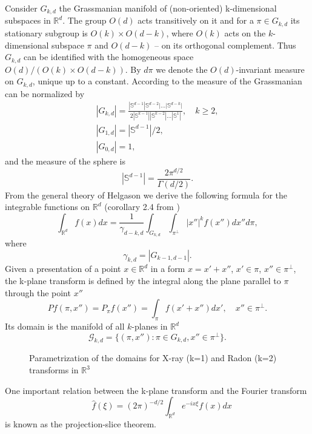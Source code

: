 \documentclass[12pt]{iopart}
\begin{document}
Consider $G_{k,d}$ the Grassmanian manifold of (non-oriented) k-dimensional subspaces in $\mathbb R^d$. The group $O(d)$ acts transitively on it and for a $\pi\in G_{k,d}$ its stationary subgroup is $O(k)\times O(d-k)$, where $O(k)$ acts on the $k$-dimensional subspace $\pi$ and $O(d-k)$ -- on its orthogonal complement. Thus $G_{k,d}$ can be identified with the homogeneous space $O(d)/(O(k)\times O(d-k))$. By $d\pi$ we denote the $O(d)$-invariant measure on $G_{k,d}$, unique up to a constant.  According to \cite{Sa} the measure of the Grassmanian can be normalized by
\begin{eqnarray*}
|G_{k,d}|=\frac{|\mathbb S^{d-1}|\mathbb S^{d-2}|\dots|\mathbb S^{d-k}|}{2|\mathbb S^{k-1}||\mathbb S^{k-2}|\dots|\mathbb S^1|},\quad k\geqslant2,\\
|G_{1,d}|=|\mathbb S^{d-1}|/2,\\
|G_{0,d}|=1,
\end{eqnarray*}
and the measure of the sphere is
    $$
    |\mathbb S^{d-1}|=\frac{2\pi^{d/2}}{\Gamma(d/2)}.
    $$
From the general theory of Helgason \cite{H} we derive the following formula for the integrable functions on $\mathbb R^d$ (corollary 2.4 from \cite{K})
\begin{equation}
\label{integral}
\int_{\mathbb R^d}f(x)dx=\frac{1}{\gamma_{d-k,d}}\int_{G_{k,d}}\int_{\pi^\perp}|x''|^kf(x'')dx''d\pi,
\end{equation}
where
$$
\gamma_{k,d}=|G_{k-1,d-1}|.
$$
Given a presentation of a point $x\in\mathbb R^d$ in a form $x=x'+x''$, $x'\in\pi$, $x''\in\pi^\perp$, the k-plane transform is defined by the integral along the plane parallel to $\pi$ through the point $x''$
	$$Pf(\pi,x'')=P_\pi f(x'')=\int_{\pi}f(x'+x'')dx',\quad x''\in\pi^\perp.$$
Its domain is the manifold of all $k$-planes in $\mathbb R^d$ 
$$\mathcal G_{k,d}=\{(\pi,x''):\pi\in G_{k,d}, x''\in\pi^\perp\}.$$

\begin{figure}[h]
\caption{Parametrization of the domains for X-ray (k=1) and Radon (k=2) transforms in $\mathbb R^3$}
\label{some example}
\end{figure}
One important relation between the k-plane transform and the Fourier transform
$$\quad \widehat f(\xi)=(2\pi)^{-d/2}\int_{\mathbb R^d}e^{-ix\xi}f(x)dx$$
is  known as the projection-slice theorem. 
\end{document}
